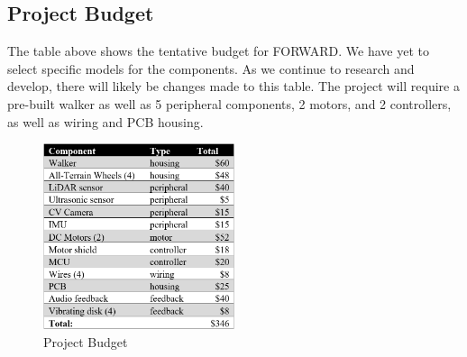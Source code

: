 \subsection{Project Budget}
\noindent The table above shows the tentative budget for FORWARD. We have yet to select specific models for the components. As we continue to research and develop, there will likely be changes made to this table. The project will require a pre-built walker as well as 5 peripheral components, 2 motors, and 2 controllers, as well as wiring and PCB housing. \\

\begin{figure}[H]
	\centering
	\includegraphics[width=0.5\textwidth]{./Images/Budget.png}
	\caption{\label{fig:Budget}Project Budget}
\end{figure}


